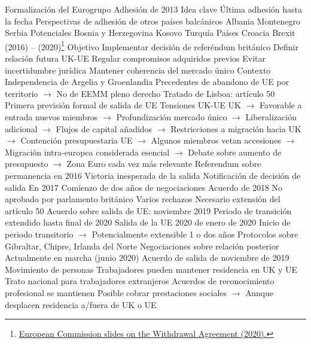 \documentclass{nuevotema}
\begin{document}
\begin{esquemal}
				\4 Formalización del Eurogrupo
		\2 Adhesión de 2013
			\3 Idea clave
				\4 Última adhesión hasta la fecha
				\4 Perspectivas de adhesión de otros países balcánicos
				\4[] Albania
				\4[] Montenegro
				\4[] Serbia
				\4 Potenciales
				\4[] Bosnia y Herzegovina
				\4[] Kosovo
				\4[] Turquía
			\3 Países
				\4 Croacia
		\2 Brexit (2016) -- (2020)\footnote{\href{https://ec.europa.eu/commission/sites/beta-political/files/slides_the_wa_explained.pdf}{European Commission slides on the Withdrawal Agreement (2020).}}
			\3 Objetivo
				\4 Implementar decisión de referéndum británico
				\4 Definir relación futura UK-UE
				\4 Regular compromisos adquiridos previos
				\4 Evitar incertidumbre jurídica
				\4 Mantener coherencia del mercado único
			\3 Contexto
				\4 Independencia de Argelia y Groenlandia
				\4[] Precedentes de abandono de UE por territorio
				\4[] $\to$ No de EEMM pleno derecho
				\4 Tratado de Lisboa: artículo 50
				\4[] Primera previsión formal de salida de UE
				\4 Tensiones UK-UE
				\4[] UK
				\4[] $\to$ Favorable a entrada nuevos miembros
				\4[] $\to$ Profundización mercado único
				\4[] $\to$ Liberalización adicional
				\4[] $\to$ Flujos de capital añadidos
				\4[] $\to$ Restricciones a migración hacia UK
				\4[] $\to$ Contención presupuestaria
				\4[] UE
				\4[] $\to$ Algunos miembros vetan accesiones
				\4[] $\to$ Migración intra-europea considerada esencial
				\4[] $\to$ Debate sobre aumento de presupuesto
				\4[] $\to$ Zona Euro cada vez más relevante
				\4 Referendum sobre permanencia en 2016
				\4[] Victoria inesperada de la salida
				\4 Notificación de decisión de salida
				\4[] En 2017
				\4[] Comienzo de dos años de negociaciones
				\4 Acuerdo de 2018
				\4[] No aprobado por parlamento británico
				\4[] Varios rechazos
				\4[] Necesario extensión del artículo 50
				\4 Acuerdo sobre salida de UE: noviembre 2019
				\4[] Periodo de transición extendido hasta final de 2020
				\4 Salida de la UE 2020
				 de enero de 2020
				\4[] Inicio de periodo transitorio
				\4[] $\to$ Potencialmente extensible 1 o dos años
				\4 Protocolos sobre Gibraltar, Chipre, Irlanda del Norte
				\4 Negociaciones sobre relación posterior
				\4[] Actualmente en marcha (junio 2020)
			\3 Acuerdo de salida de noviembre de 2019
				\4 Movimiento de personas
				\4[] Trabajadores pueden mantener residencia en UK y UE
				\4[] Trato nacional para trabajadores extranjeros
				\4[] Acuerdos de reconocimiento profesional se mantienen
				\4[] Posible cobrar prestaciones sociales
				\4[] $\to$ Aunque desplacen residencia a/fuera de UK o UE

\end{esquemal}
\end{document}
